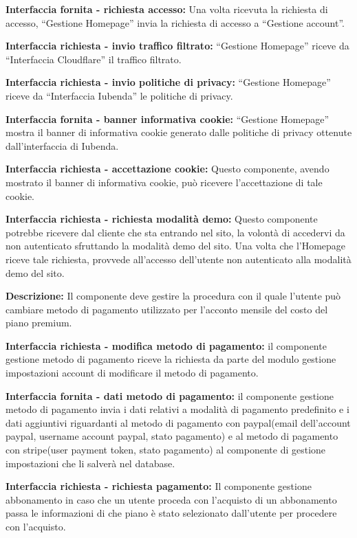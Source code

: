 \begin{listaPersonale}[]{}
    \textbf{Interfaccia fornita - richiesta accesso:} Una volta ricevuta la richiesta di accesso, “Gestione Homepage” invia la richiesta di accesso a “Gestione account”.

    \textbf{Interfaccia richiesta - invio traffico filtrato:} “Gestione Homepage” riceve da “Interfaccia Cloudflare” il traffico filtrato.

    \textbf{Interfaccia richiesta - invio politiche di privacy:} “Gestione Homepage” riceve da “Interfaccia Iubenda” le politiche di privacy.

    \textbf{Interfaccia fornita - banner informativa cookie:} “Gestione Homepage” mostra il banner di informativa cookie generato dalle politiche di privacy ottenute dall'interfaccia di Iubenda.

    \textbf{Interfaccia richiesta - accettazione cookie:} Questo componente, avendo mostrato il banner di informativa cookie, può ricevere l'accettazione di tale cookie.

    \textbf{Interfaccia richiesta - richiesta modalità demo:} Questo componente potrebbe ricevere dal cliente che sta entrando nel sito, la volontà di accedervi da non autenticato sfruttando la modalità demo del sito. Una volta che l'Homepage riceve tale richiesta, provvede all'accesso dell'utente non autenticato alla modalità demo del sito.



    \textbf{Descrizione:} Il componente deve gestire la procedura con il quale l'utente può cambiare metodo di pagamento utilizzato per l'acconto mensile del costo del piano premium.

    \textbf{Interfaccia richiesta - modifica metodo di pagamento:} il componente gestione metodo di pagamento riceve la richiesta da parte del modulo gestione impostazioni account di modificare il metodo di pagamento.

    \textbf{Interfaccia fornita - dati metodo di pagamento:} il componente gestione metodo di pagamento invia i dati relativi a modalità di pagamento predefinito e i dati aggiuntivi riguardanti al metodo di pagamento con paypal(email dell'account paypal, username account paypal, stato pagamento) e al metodo di pagamento con stripe(user payment token, stato pagamento) al componente di gestione impostazioni che li salverà nel database.

    \textbf{Interfaccia richiesta - richiesta pagamento:} Il componente gestione abbonamento in caso che un utente proceda con l'acquisto di un abbonamento passa le informazioni di che piano è stato selezionato dall'utente per procedere con l'acquisto.


\end{listaPersonale}
